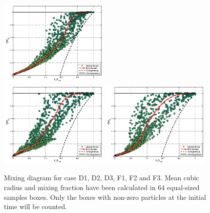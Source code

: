 \documentclass[draft,jgrga]{AGUTeX}
\begin{document}
\begin{article}
\begin{figure}
\includegraphics[width=0.48\textwidth]{Figures/mixing_casef2}\\
\includegraphics[width=0.48\textwidth]{Figures/mixing_cased3}
\includegraphics[width=0.48\textwidth]{Figures/mixing_casef3}
\caption{Mixing diagram for case D1, D2, D3, F1, F2 and F3. Mean cubic radius and mixing fraction have been calculated in 64 equal-sized samples boxes. Only the boxes with non-zero particles at the initial time will be counted.\label{fig:mixing_diagram}}
\end{figure}


\end{article}
\end{document}
